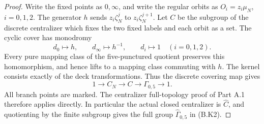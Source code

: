 \begin{proof}
Write the fixed points as $0,\infty$, and write the regular orbits
as $O_i=z_i\mu_N$, $i=0,1,2$.  The generator $h$ sends
$z_i\zeta_N^j$ to $z_i\zeta_N^{j+1}$.  Let $C$ be the subgroup of
the discrete centralizer which fixes the two fixed labels and each
orbit as a set.  The cyclic cover has monodromy
\[
 d_0\mapsto h,\qquad d_\infty\mapsto h^{-1},\qquad
 d_i\mapsto1\quad(i=0,1,2).                             \tag{B.K1}
\]
Every pure mapping class of the five-punctured quotient preserves
this homomorphism, and hence lifts to a mapping class commuting
with $h$.  The kernel consists exactly of the deck transformations.
Thus the discrete covering map gives
\[
             1\longrightarrow C_N\longrightarrow C
                \longrightarrow\Gamma_{0,5}\longrightarrow1.
                                                               \tag{B.K2}
\]
All branch points are marked.  The centralizer full-topology proof
of Part A.1 therefore applies directly.  In particular the actual
closed centralizer is $\widehat C$, and quotienting by the finite
subgroup gives the full group $\widehat\Gamma_{0,5}$ in (B.K2).


\end{proof}
